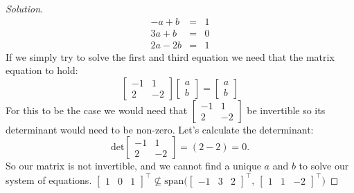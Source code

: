 \documentclass[12pt]{amsart}
\newenvironment{solution}
{\begin{proof}[Solution]}
{\end{proof}}
\begin{document}
\begin{onehalfspace}
\begin{solution}
\begin{eqnarray*}
                -a + b & = & 1 \\
                3a + b & = & 0 \\
                2a - 2b & = & 1
            \end{eqnarray*}
            If we simply try to solve the first and third equation we need that the matrix equation to hold:
            \begin{displaymath}
                \left[\begin{matrix}
                          -1 & 1\\
                          2 & -2
                \end{matrix}\right]
                \left[\begin{matrix}
                          a \\
                          b
                \end{matrix}\right] =
                \left[\begin{matrix}
                          a \\
                          b
                \end{matrix}\right]
            \end{displaymath}
            For this to be the case we would need that $\left[\begin{matrix} -1 & 1\\ 2 & -2 \end{matrix}\right]$ be
            invertible so its determinant would need to be non-zero. Let's calculate the determinant:
            \begin{displaymath}
                \text{det}\left[\begin{matrix}
                                    -1 & 1\\
                                    2 & -2
                \end{matrix}\right] = (2 - 2) = 0.
            \end{displaymath}
            So our matrix is not invertible, and we cannot find a unique $a$ and $b$ to solve our system of equations.
            $[\begin{matrix}1 & 0 & 1\end{matrix}]^\top
            \not\subseteq \text{span}([\begin{matrix}-1 & 3 & 2\end{matrix}]^\top$, $[\begin{matrix} 1 & 1 & -2\end{matrix}]^\top)$
        \end{solution}


\end{onehalfspace}
\end{document}
